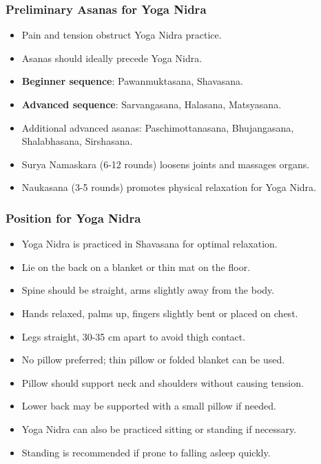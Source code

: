 \begin{frame}[fragile]\frametitle{Preliminary Asanas for Yoga Nidra}
      \begin{itemize}
        \item Pain and tension obstruct Yoga Nidra practice.
        \item Asanas should ideally precede Yoga Nidra.
        \item \textbf{Beginner sequence}: Pawanmuktasana, Shavasana.
        \item \textbf{Advanced sequence}: Sarvangasana, Halasana, Matsyasana.
        \item Additional advanced asanas: Paschimottanasana, Bhujangasana, Shalabhasana, Sirshasana.
        \item Surya Namaskara (6-12 rounds) loosens joints and massages organs.
        \item Naukasana (3-5 rounds) promotes physical relaxation for Yoga Nidra.
      \end{itemize}
\end{frame}

\begin{frame}[fragile]\frametitle{Position for Yoga Nidra}
      \begin{itemize}
        \item Yoga Nidra is practiced in Shavasana for optimal relaxation.
        \item Lie on the back on a blanket or thin mat on the floor.
        \item Spine should be straight, arms slightly away from the body.
        \item Hands relaxed, palms up, fingers slightly bent or placed on chest.
        \item Legs straight, 30-35 cm apart to avoid thigh contact.
        \item No pillow preferred; thin pillow or folded blanket can be used.
        \item Pillow should support neck and shoulders without causing tension.
        \item Lower back may be supported with a small pillow if needed.
        \item Yoga Nidra can also be practiced sitting or standing if necessary.
        \item Standing is recommended if prone to falling asleep quickly.
      \end{itemize}
\end{frame}

